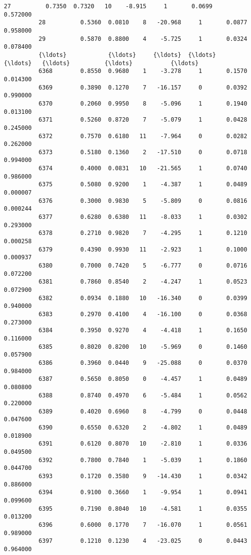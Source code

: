 \documentclass[11pt]{article}
\begin{document}
\begin{Verbatim}[commandchars=\\\{\}]
          27          0.7350  0.7320   10    -8.915     1       0.0699      0.572000   
          28          0.5360  0.0810    8   -20.968     1       0.0877      0.958000   
          29          0.5870  0.8800    4    -5.725     1       0.0324      0.078400   
          {\ldots}            {\ldots}     {\ldots}  {\ldots}       {\ldots}   {\ldots}          {\ldots}           {\ldots}   
          6368        0.8550  0.9680    1    -3.278     1       0.1570      0.014300   
          6369        0.3890  0.1270    7   -16.157     0       0.0392      0.990000   
          6370        0.2060  0.9950    8    -5.096     1       0.1940      0.013100   
          6371        0.5260  0.8720    7    -5.079     1       0.0428      0.245000   
          6372        0.7570  0.6180   11    -7.964     0       0.0282      0.262000   
          6373        0.5180  0.1360    2   -17.510     0       0.0718      0.994000   
          6374        0.4000  0.0831   10   -21.565     1       0.0740      0.986000   
          6375        0.5080  0.9200    1    -4.387     1       0.0489      0.000007   
          6376        0.3000  0.9830    5    -5.809     0       0.0816      0.000244   
          6377        0.6280  0.6380   11    -8.033     1       0.0302      0.293000   
          6378        0.2710  0.9820    7    -4.295     1       0.1210      0.000258   
          6379        0.4390  0.9930   11    -2.923     1       0.1000      0.000937   
          6380        0.7000  0.7420    5    -6.777     0       0.0716      0.072200   
          6381        0.7860  0.8540    2    -4.247     1       0.0523      0.072900   
          6382        0.0934  0.1880   10   -16.340     0       0.0399      0.940000   
          6383        0.2970  0.4100    4   -16.100     0       0.0368      0.273000   
          6384        0.3950  0.9270    4    -4.418     1       0.1650      0.116000   
          6385        0.8020  0.8200   10    -5.969     0       0.1460      0.057900   
          6386        0.3960  0.0440    9   -25.088     0       0.0370      0.984000   
          6387        0.5650  0.8050    0    -4.457     1       0.0489      0.080800   
          6388        0.8740  0.4970    6    -5.484     1       0.0562      0.220000   
          6389        0.4020  0.6960    8    -4.799     0       0.0448      0.047600   
          6390        0.6550  0.6320    2    -4.802     1       0.0489      0.018900   
          6391        0.6120  0.8070   10    -2.810     1       0.0336      0.049500   
          6392        0.7800  0.7840    1    -5.039     1       0.1860      0.044700   
          6393        0.1720  0.3580    9   -14.430     1       0.0342      0.886000   
          6394        0.9100  0.3660    1    -9.954     1       0.0941      0.099600   
          6395        0.7190  0.8040   10    -4.581     1       0.0355      0.013200   
          6396        0.6000  0.1770    7   -16.070     1       0.0561      0.989000   
          6397        0.1210  0.1230    4   -23.025     0       0.0443      0.964000   
          

\end{Verbatim}
\end{document}
